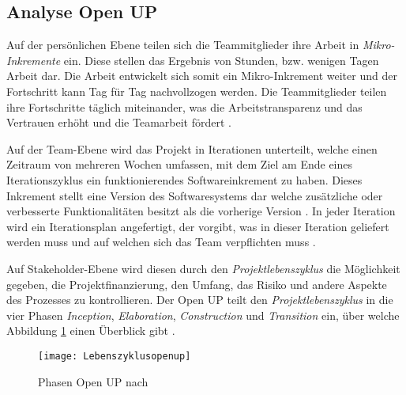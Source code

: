 \subsection{Analyse Open UP}


Auf der persönlichen Ebene teilen sich die Teammitglieder ihre Arbeit in \textit{Mikro-Inkremente} ein. Diese stellen das Ergebnis von Stunden, bzw. wenigen Tagen Arbeit dar. Die Arbeit entwickelt sich somit ein Mikro-Inkrement weiter und der Fortschritt kann Tag für Tag nachvollzogen werden. Die Teammitglieder teilen ihre Fortschritte täglich miteinander, was die Arbeitstransparenz und das Vertrauen erhöht und die Teamarbeit fördert \cite{eclipseopenup}. \newline

Auf der Team-Ebene wird das Projekt in Iterationen unterteilt, welche einen Zeitraum von mehreren Wochen umfassen, mit dem Ziel am Ende eines Iterationszyklus ein funktionierendes Softwareinkrement zu haben. Dieses Inkrement stellt eine Version des Softwaresystems dar welche zusätzliche oder verbesserte Funktionalitäten besitzt als die vorherige Version \cite{Basem2010}.  In jeder Iteration wird ein Iterationsplan angefertigt,  der vorgibt, was in dieser Iteration geliefert werden muss und auf welchen sich das Team verpflichten muss \cite{freudenreichevaluierung}.

Auf Stakeholder-Ebene wird diesen durch den \textit{Projektlebenszyklus} die Möglichkeit gegeben, die Projektfinanzierung, den Umfang, das Risiko und andere Aspekte des Prozesses zu kontrollieren.
Der Open UP teilt den \textit{Projektlebenszyklus} in die vier Phasen \textit{Inception}, \textit{Elaboration}, \textit{Construction} und \textit{Transition} ein, über welche Abbildung \ref{fig:Phasen} einen Überblick gibt \cite{eclipseopenup}.

\begin{figure}[htp]
\begin{center}
  \texttt{[image: Lebenszyklusopenup]} %
  \caption{Phasen Open UP nach \cite{eclipseopenup}}
  \label{fig:Phasen}
\end{center}
\end{figure}


